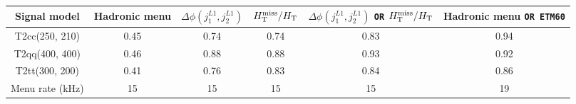 \begin{table}[h!]
\footnotesize
\centering
\begin{tabular}{cccccc} 
\hline
\hline
  Signal model & Hadronic menu & $\Delta\phi(j_{1}^{L1},j_{2}^{L1})$ & $\mbox{$H_{\rm T}^{\rm miss}$}/\mbox{$H_\text{T}$}$ &$\Delta\phi(j_{1}^{L1},j_{2}^{L1})$ \verb!OR! $\mbox{$H_{\rm T}^{\rm miss}$}/\mbox{$H_\text{T}$}$ & Hadronic menu \verb!OR ETM60! \\
\hline
  T2cc(250, 210)   & 0.45 & 0.74 & 0.74 & 0.83 & 0.94 \\
  T2qq(400, 400)   & 0.46 & 0.88 & 0.88 & 0.93 & 0.92 \\
  T2tt(300, 200)   & 0.41 & 0.76 & 0.83 & 0.84 & 0.86 \\
\hline
  Menu rate (kHz) & 15   & 15   & 15   & 15   & 19   \\
\hline
\hline
\end{tabular}
\label{tab:LowHT_Seed_Signal_3Jet}
\end{table}



